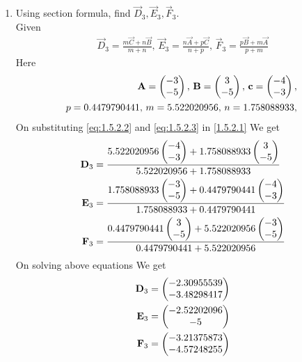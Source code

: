 \documentclass[11pt]{book}
\begin{document}
\begin{enumerate}[label=\thesection.\arabic*.,ref=\thesection.\theenumi]
\item Using section formula, find $\vec{D}_3, \vec{E}_3, \vec{F}_3$. \\
\solution Given
\begin{align}
			\vec{D}_3 = \frac{m\vec{C}+n\vec{B}}{m+n},\,
			\vec{E}_3 = \frac{n\vec{A}+p\vec{C}}{n+p},\,
			\vec{F}_3 = \frac{p\vec{B}+m\vec{A}}{p+m} \label{eq:1.5.2.1}
\end{align}
Here
\begin{align}
    \vec{A}=\myvec{-3 \\ -5},\,
\vec{B}=\myvec{3\\-5},\,
	\vec{c}=\myvec{-4\\-3},\, \label{eq:1.5.2.2} \\
     p=0.4479790441 ,\,
    m=5.522020956 ,\,
    n=1.758088933,\,  \label{eq:1.5.2.3}
\end{align}
On substituting \eqref{eq:1.5.2.2} and \eqref{eq:1.5.2.3} in \eqref{1.5.2.1} We get
\begin{align}
    \mathbf{D}_3 &= \frac{5.522020956\begin{pmatrix}-4 \\ -3\end{pmatrix} + 1.758088933\begin{pmatrix}3\\-5\end{pmatrix}}{5.522020956+1.758088933} \\
    \mathbf{E}_3 &= \frac{1.758088933\begin{pmatrix}-3 \\ -5\end{pmatrix} + 0.4479790441\begin{pmatrix}-4\\-3\end{pmatrix}}{1.758088933+0.4479790441} \\
    \mathbf{F}_3 &= \frac{0.4479790441\begin{pmatrix}3 \\ -5\end{pmatrix} + 5.522020956\begin{pmatrix}-3\\-5\end{pmatrix}}{0.4479790441+5.522020956}
\end{align}
On solving above equations We get 
\begin{align}
    \mathbf{D}_3 &= \begin{pmatrix}-2.30955539  \\ -3.48298417\end{pmatrix} \\
    \mathbf{E}_3 &= \begin{pmatrix}-2.52202096  \\ -5\end{pmatrix} \\
    \mathbf{F}_3 &= \begin{pmatrix}-3.21375873 \\ -4.57248255\end{pmatrix} 
\end{align}
\begin{figure}[H]
    \centering

\end{figure}
\end{enumerate}
\end{document}
